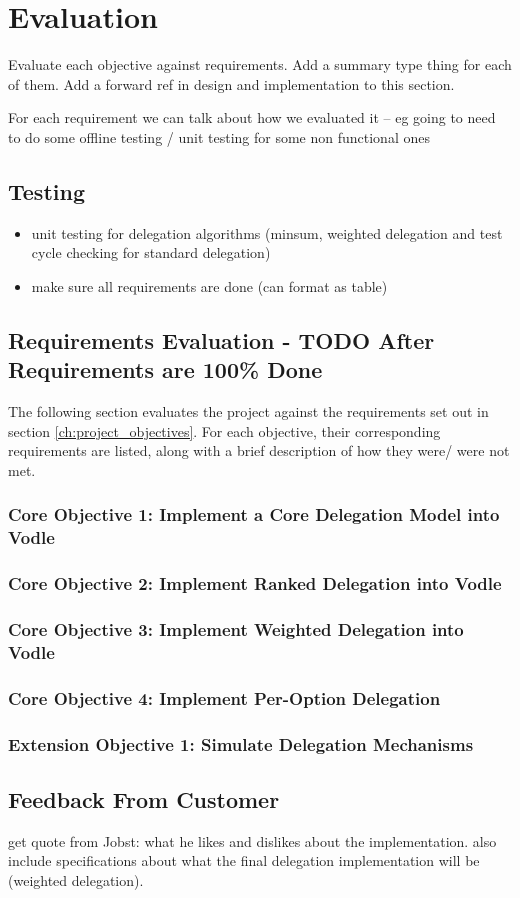 \chapter{Evaluation}\label{ch:evaluation}


Evaluate each objective against requirements. Add a summary type thing for each of them.
Add a forward ref in design and implementation to this section.

For each requirement we can talk about how we evaluated it -- eg going to need to do some offline testing / unit testing for some non functional ones


\section{Testing}
\begin{itemize}
    \item unit testing for delegation algorithms (minsum, weighted delegation and test cycle checking for standard delegation)
    \item make sure all requirements are done (can format as table)
\end{itemize}
\section{Requirements Evaluation - TODO After Requirements are 100\% Done}
The following section evaluates the project against the requirements set out in section \ref{ch:project_objectives}. For each objective, their corresponding requirements are listed, along with a brief description of how they were/ were not met.

\subsection{Core Objective 1: Implement a Core Delegation Model into Vodle}
\subsection{Core Objective 2: Implement Ranked Delegation into Vodle}
\subsection{Core Objective 3: Implement Weighted Delegation into Vodle}
\subsection{Core Objective 4: Implement Per-Option Delegation}
\subsection{Extension Objective 1: Simulate Delegation Mechanisms}

\section{Feedback From Customer}
get quote from Jobst: what he likes and dislikes about the implementation. also include specifications about what the final delegation implementation will be (weighted delegation).
